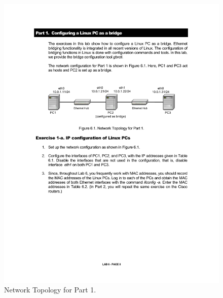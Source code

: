 \begin{figure}[h!t]
	\centering
	\includegraphics[width=\linewidth]{graphics/lab6-network1.pdf}	
	\caption{Network Topology for Part 1.}
	\label{fig:lab6-network1}
\end{figure}

